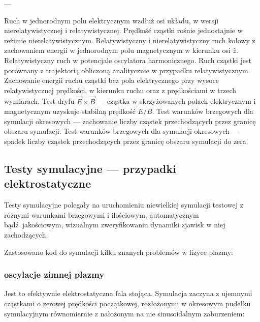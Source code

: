 \begin{enumerate}
        \itemi{}  --- 
            \begin{enumerate}
                \itemii{} Ruch w jednorodnym polu elektrycznym wzdłuż osi układu,
                    w wersji nierelatywistycznej i relatywistycznej. Prędkość cząstki rośnie
                    jednostajnie w reżimie nierelatywistycznym.
                \itemii{} Relatywistyczny i nierelatywistyczny ruch kołowy z
                    zachowaniem energii w jednorodnym polu magnetycznym w kierunku osi $\hat{z}$. 
                \itemii{} Relatywistyczny ruch w potencjale oscylatora harmonicznego. Ruch cząstki jest porównany
                    z trajektorią obliczoną analitycznie w przypadku relatywistycznym.
                \itemii{} Zachowanie energii ruchu cząstki bez pola elektrycznego przy wysoce relatywistycznej prędkości, w kierunku ruchu oraz z prędkościami
                    w trzech wymiarach.
                \itemii{} Test dryfu $\vec{E} \times \vec{B}$ --- cząstka w skrzyżowanych polach elektrycznym i magnetycznym uzyskuje stabilną prędkość $E/B$.
                \itemii{} Test warunków brzegowych dla symulacji okresowych --- zachowanie liczby cząstek przechodzących przez granicę obszaru symulacji.
                \itemii{} Test warunków brzegowych dla symulacji okresowych --- spadek liczby cząstek przechodzących przez granicę obszaru symulacji do zera.
            \end{enumerate}
    \end{enumerate}

    \subsection{Testy symulacyjne --- przypadki elektrostatyczne}
    Testy symulacyjne polegały na uruchomieniu niewielkiej symulacji testowej z
    różnymi warunkami brzegowymi i ilościowym, automatycznym bądź jakościowym, wizualnym zweryfikowaniu
    dynamiki zjawisk w niej zachodzących.

    Zastosowano kod do symulacji kilku znanych problemów w fizyce plazmy:
    \subsubsection{oscylacje zimnej plazmy}
    Jest to efektywnie elektrostatyczna fala stojąca. Symulacja zaczyna z ujemnymi cząstkami
o zerowej prędkości początkowej, rozłożonymi w okresowym pudełku symulacyjnym
równomiernie z nałożonym na nie sinusoidalnym zaburzeniem:

